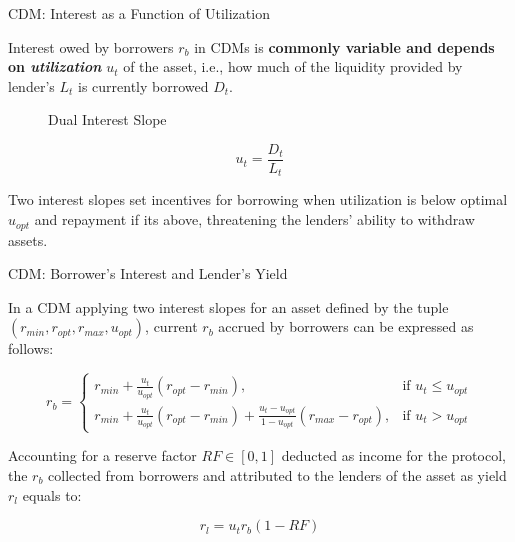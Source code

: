 \documentclass[]{beamer}
\begin{document}
\begin{frame}{CDM: Interest as a Function of Utilization }

Interest owed by borrowers $r_b$ in CDMs is \textbf{commonly variable and depends on \textit{utilization}} $u_t$ of the asset, i.e., how much of the liquidity provided by lender's $L_t$ is currently borrowed $D_t$.

\vspace{1.5em}

 {
\begin{minipage}{0.6\textwidth}
	\begin{figure}[t]
		\centering
		\begin{tikzpicture}[scale=0.5, every node/.style={scale=0.8}]
			
		\end{tikzpicture}
		\caption{Dual Interest Slope}
	\end{figure}
\end{minipage}
\begin{minipage}{0.38\textwidth}
	\vspace{-1em}
	\begin{equation*}
		u_t = \dfrac{D_t}{L_t}
	\end{equation*}
	
	\vspace{0.5 em}
	Two interest slopes set incentives for borrowing when utilization is below optimal $u_{opt}$ and repayment if its above, threatening the lenders' ability to withdraw assets.
	
\end{minipage}	
}

\end{frame}


\begin{frame}{CDM: Borrower's Interest and Lender's Yield }

In a CDM applying two interest slopes for an asset defined by the tuple $(r_{min}, r_{opt}, r_{max}, u_{opt})$, current $r_b$ accrued by borrowers can be expressed as follows:

\vspace{-0.5em}

\begin{equation*}
	r_b = 
		\begin{cases}
		r_{min} + \frac{u_t}{u_{opt}}(r_{opt}-r_{min}), & \text{if } u_t \leq u_{opt}\\
		r_{min} + \frac{u_t}{u_{opt}}(r_{opt}-r_{min}) + \frac{u_t-u_{opt}}{1-u_{opt}}(r_{max}-r_{opt}), & \text{if } u_t > u_{opt}
		\end{cases}
\end{equation*}

\vspace{1em}

 {
Accounting for a reserve factor $RF \in [0,1]$ deducted as income for the protocol, the $r_b$ collected from borrowers and attributed to the lenders of the asset as yield $r_l$ equals to:

\begin{equation*}
	r_l = u_t r_b (1-RF) 
\end{equation*}
}

\end{frame}
\end{document}

